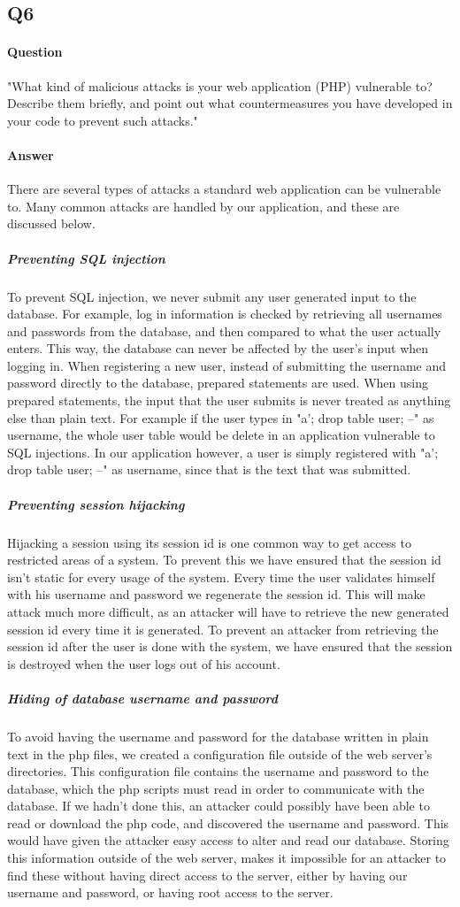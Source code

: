 \documentclass[11pt, a4paper]{article}
\begin{document}
\subsection{Q6}
\paragraph{Question}
"What kind of malicious attacks is your web application (PHP) vulnerable to? Describe them briefly, and point out what countermeasures you have developed in your code to prevent such attacks."
\paragraph{Answer}
There are several types of attacks a standard web application can be vulnerable to. Many common attacks are handled by our application, and these are discussed below.
\subparagraph{Preventing SQL injection}
To prevent SQL injection, we never submit any user generated input to the database. For example, log in information is checked by retrieving all usernames and passwords from the database, and then compared to what the user actually enters. This way, the database can never be affected by the user's input when logging in.
When registering a new user, instead of submitting the username and password directly to the database, prepared statements are used. When using prepared statements, the input that the user submits is never treated as anything else than plain text. For example if the user types in "a'; drop table user; --" as username, the whole user table would be delete in an application vulnerable to SQL injections. In our application however, a user is simply registered with "a'; drop table user; --" as username, since that is the text that was submitted.
\subparagraph{Preventing session hijacking}
Hijacking a session using its session id is one common way to get access to restricted areas of a system. To prevent this we have ensured that the session id isn't static for every usage of the system. Every time the user validates himself with his username and password we regenerate the session id. This will make attack much more difficult, as an attacker will have to retrieve the new generated session id every time it is generated. To prevent an attacker from retrieving the session id after the user is done with the system, we have ensured that the session is destroyed when the user logs out of his account. 
\subparagraph{Hiding of database username and password}
To avoid having the username and password for the database written in plain text in the php files, we created a configuration file outside of the web server's directories. This configuration file contains the username and password to the database, which the php scripts must read in order to communicate with the database. If we hadn't done this, an attacker could possibly have been able to read or download the php code, and discovered the username and password. This would have given the attacker easy access to alter and read our database. Storing this information outside of the web server, makes it impossible for an attacker to find these without having direct access to the server, either by having our username and password, or having root access to the server. 
\end{document}
